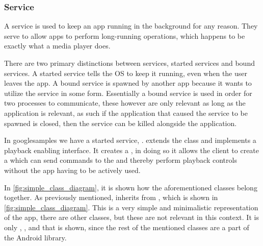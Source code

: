 \subsubsection{Service}\label{subsec:services}
A service is used to keep an app running in the background for any reason.
They serve to allow apps to perform long-running operations, which happens to be exactly what a media player does.

There are two primary distinctions between services, started services and bound services.
A started service tells the OS to keep it running, even when the user leaves the app.
A bound service is spawned by another app because it wants to utilize the service in some form.
Essentially a bound service is used in order for two processes to communicate, these however are only relevant as long as the application is relevant, as such if the application that caused the service to be spawned is closed, then the service can be killed alongside the application.\cite{androidFundamentals}

In googlesamples we have a started service, .
\sloppy{} extends the  class and implements a playback enabling interface.
It creates a , in doing so it allows the client to create a  which can send commands to the  and thereby perform playback controls without the app having to be actively used.

In \cref{fig:simple_class_diagram}, it is shown how the aforementioned classes belong together.
As previously mentioned,  inherits from , which is shown in \cref{fig:simple_class_diagram}.
This is a very simple and minimalistic representation of the app, there are other classes, but these are not relevant in this context.
It is only , , and  that is shown, since the rest of the mentioned classes are a part of the Android library.

